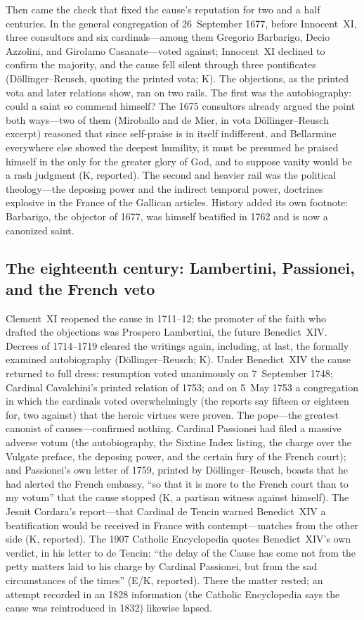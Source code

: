Then came the check that fixed the cause's reputation for two and
a half centuries. In the general congregation of 26~September
1677, before Innocent~XI, three consultors and six
cardinals---among them Gregorio Barbarigo, Decio Azzolini, and
Girolamo Casanate---voted against; Innocent~XI declined to
confirm the majority, and the cause fell silent through three
pontificates (D\"ollinger--Reusch, quoting the printed vota; K).
The objections, as the printed vota and later relations show,
ran on two rails. The first was the autobiography: could a saint
so commend himself? The 1675 consultors already argued the point
both ways---two of them (Miroballo and de Mier, in vota
D\"ollinger--Reusch excerpt) reasoned that since self-praise is
in itself indifferent, and Bellarmine everywhere else showed the
deepest humility, it must be presumed he praised himself in the
 only for the greater glory of God, and to suppose
vanity would be a rash judgment (K, reported). The second and
heavier rail was the political theology---the deposing power and
the indirect temporal power, doctrines explosive in the France
of the Gallican articles. History added
its own footnote: Barbarigo, the objector of 1677, was himself
beatified in 1762 and is now a canonized saint.

\subsection{The eighteenth century: Lambertini, Passionei, and
the French veto}

Clement~XI reopened the cause in 1711--12; the promoter of the
faith who drafted the objections was Prospero Lambertini, the
future Benedict~XIV. Decrees of 1714--1719 cleared the writings
again, including, at last, the formally examined autobiography
(D\"ollinger--Reusch; K). Under Benedict~XIV the cause returned
to full dress: resumption voted unanimously on 7~September 1748;
Cardinal Cavalchini's printed relation of 1753; and on 5~May 1753
a congregation in which the cardinals voted overwhelmingly (the
reports say fifteen or eighteen for, two against) that the heroic
virtues were proven. The pope---the greatest canonist of
causes---confirmed nothing. Cardinal Passionei had filed a
massive adverse votum (the autobiography, the Sixtine Index
listing, the  charge over the Vulgate preface,
the deposing power, and the certain fury of the French court);
and Passionei's own letter of 1759, printed by
D\"ollinger--Reusch, boasts that he had alerted the French
embassy, ``so that it is more to the French court than to my
votum'' that the cause stopped (K, a partisan witness against
himself). The Jesuit Cordara's report---that Cardinal de Tencin
warned Benedict~XIV a beatification would be received in France
with contempt---matches from the other side (K, reported). The
1907 Catholic Encyclopedia quotes Benedict~XIV's own verdict, in
his letter to de Tencin: ``the delay of the Cause has come not
from the petty matters laid to his charge by Cardinal Passionei,
but from the sad circumstances of the times'' (E/K, reported).
There the matter rested; an attempt recorded in an 1828
information (the Catholic Encyclopedia says the cause was
reintroduced in 1832) likewise lapsed.

